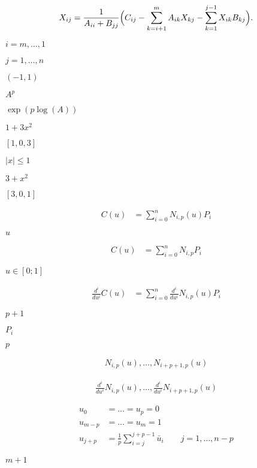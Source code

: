 \documentclass{article}
\begin{document}
\[ 
    X_{ij} = \frac{1}{A_{ii} + B_{jj}} \Bigl( C_{ij}
    - \sum_{k=i+1}^m A_{ik} X_{kj} - \sum_{k=1}^{j-1} X_{ik} B_{kj} \Bigr).
\]
\pagebreak

$ i=m,\ldots,1 $
\pagebreak

$ j=1,\ldots,n $
\pagebreak

$ (-1, 1) $
\pagebreak

$ A^p $
\pagebreak

$
\exp(p \log(A)) $
\pagebreak

$ 1 + 3x^2 $
\pagebreak

$ [ 1, 0, 3 ] $
\pagebreak

$ |x| \le 1 $
\pagebreak

$ 3 + x^2 $
\pagebreak

$ [ 3, 0, 1 ] $
\pagebreak

\begin{align*}
  C(u) & = \sum_{i=0}^{n}N_{i,p}(u)P_i
\end{align*}
\pagebreak

$u$
\pagebreak

\begin{align*}
  C(u) & = \sum_{i=0}^{n}N_{i,p}P_i
\end{align*}
\pagebreak

$u \in [0;1]$
\pagebreak

\begin{align*}
  \frac{d^i}{du^i}C(u) & = \sum_{i=0}^{n} \frac{d^i}{du^i} N_{i,p}(u)P_i
\end{align*}
\pagebreak

$p+1$
\pagebreak

$P_i$
\pagebreak

$p$
\pagebreak

\begin{align*}
  N_{i,p}(u), \hdots, N_{i+p+1,p}(u)
\end{align*}
\pagebreak

\begin{align*}
  \frac{d^i}{du^i} N_{i,p}(u), \hdots, \frac{d^i}{du^i} N_{i+p+1,p}(u)
\end{align*}
\pagebreak

\begin{align*}
 u_0 & = \hdots = u_p = 0 \\
 u_{m-p} & = \hdots = u_{m} = 1 \\
 u_{j+p} & = \frac{1}{p}\sum_{i=j}^{j+p-1}\bar{u}_i \quad\quad j=1,\hdots,n-p
\end{align*}
\pagebreak

$m+1$
\pagebreak
\end{document}
